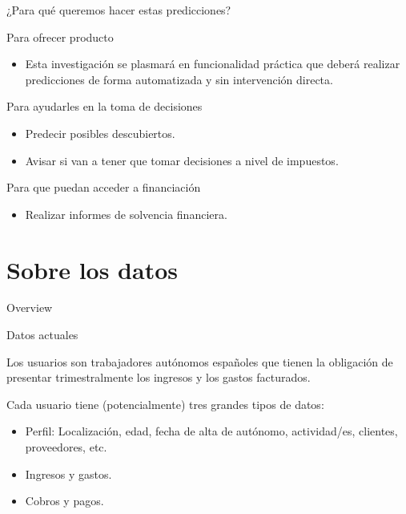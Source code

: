 \documentclass[12pt, aspectratio=169]{beamer} %
\begin{document}
\begin{frame}{¿Para qué queremos hacer estas predicciones?}
  \begin{block}{Para ofrecer producto}
    \begin{itemize}
    \item Esta investigación se plasmará en funcionalidad práctica que deberá realizar predicciones de forma automatizada y sin intervención directa.
    \end{itemize}
  \end{block}
  \begin{block}{Para ayudarles en la toma de decisiones}
    \begin{itemize}
    \item Predecir posibles descubiertos.
    \item Avisar si van a tener que tomar decisiones a nivel de impuestos.
    \end{itemize}
  \end{block}
  \begin{block}{Para que puedan acceder a financiación}
    \begin{itemize}
    \item Realizar informes de solvencia financiera.
    \end{itemize}
  \end{block}

\end{frame}



\section{Sobre los datos}
\begin{frame}{Overview}
\tableofcontents
\end{frame}


\begin{frame}{Datos actuales}
  
  Los usuarios son trabajadores autónomos españoles que tienen la obligación de presentar trimestralmente los ingresos y los gastos facturados.

  Cada usuario tiene (potencialmente) tres grandes tipos de datos:
  \begin{itemize}
  \item Perfil: Localización, edad, fecha de alta de autónomo, actividad/es, clientes, proveedores, etc.
  \item Ingresos y gastos.
  \item Cobros y pagos.    
  \end{itemize}

\end{frame}
\end{document}
